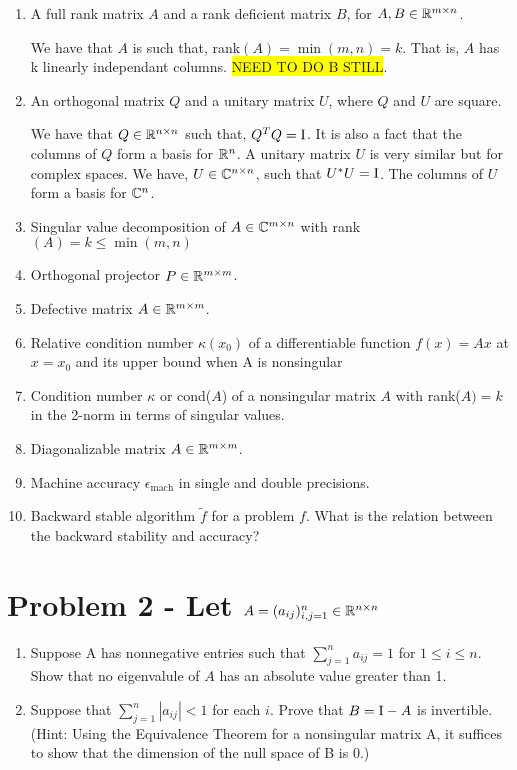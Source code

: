 \documentclass{article}
\begin{document}
\begin{enumerate}

\item A full rank matrix $A$ and a rank deficient matrix $B$, for $A, B \in  \mathbb{R}^{m\times n}$. 

We have that $A$ is such that, rank$(A) = \min(m, n) = k$. That is, $A$ has k linearly independant columns. \colorbox{yellow}{NEED TO DO B STILL}.

\item An orthogonal matrix $Q$ and a unitary matrix $U$, where $Q$ and $U$ are square. 

We have that $Q \in \mathbb{R}^{n\times n}$ such that, $Q^TQ = \mathrm{I}$. It is also a fact that the columns of $Q$ form a basis for $\mathbb{R}^n$. A unitary matrix $U$ is very similar but for complex spaces. We have, $U \in \mathbb{C}^{n\times n}$, such that $U^*U = \mathrm{I}$. The columns of $U$ form a basis for $\mathbb{C}^n$.

\item Singular value decomposition of $A \in \mathbb{C}^{m\times n}$ with rank$(A) = k \le \min(m, n)$

\item Orthogonal projector $P \in \mathbb{R}^{m\times m}$. 

\item Defective matrix $A \in \mathbb{R}^{m\times m}$.

\item Relative condition number $\kappa(x_0)$ of a differentiable function $f(x) = Ax$ at $x = x_0$ and its upper bound when A is nonsingular

\item Condition number $\kappa$ or cond($A$) of a nonsingular matrix $A$ with rank($A) = k$ in the 2-norm in terms of singular values.

\item Diagonalizable matrix $A \in \mathbb{R}^{m\times m}$.

\item Machine accuracy $\epsilon_{\text{mach}}$ in single and double precisions.

\item Backward stable algorithm $\tilde{f}$ for a problem $f$. What is the relation between the backward stability and accuracy?


\end{enumerate}

\section{Problem 2 - Let $A = (a_{ij})_{i,j=1}^n \in \mathbb{R}^{n\times n}$}
\begin{enumerate}
\item Suppose A has nonnegative entries such that $\sum_{j=1}^n a_{ij} = 1$ for $1 \le i \le n$. Show that no eigenvalule of $A$ has an absolute value greater than 1. 

\item Suppose that $\sum_{j=1}^n |a_{ij}| < 1$ for each $i$. Prove that $B = \mathrm{I} - A$ is invertible.  (Hint: Using the Equivalence Theorem for a nonsingular matrix A, it suffices to show that the dimension of the null space of B is 0.)

\end{enumerate}
\end{document}

